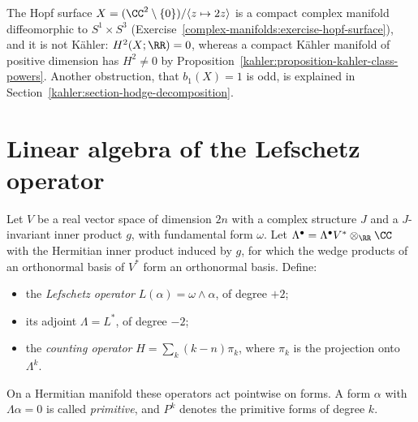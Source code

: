 \begin{counterexample}\label{kahler:counterexample-hopf}
The Hopf surface $X = (\CC^2 \setminus \{0\})/\langle z \mapsto 2z\rangle$ is a compact complex manifold diffeomorphic to $S^1 \times S^3$
(Exercise~\ref{complex-manifolds:exercise-hopf-surface}), and it is not K\"ahler: $H^2(X; \RR) = 0$, whereas a compact K\"ahler manifold of positive
dimension has $H^2 \neq 0$ by Proposition~\ref{kahler:proposition-kahler-class-powers}. Another obstruction, that $b_1(X) = 1$ is odd, is
explained in Section~\ref{kahler:section-hodge-decomposition}.
\end{counterexample}

\section{Linear algebra of the Lefschetz operator}\label{kahler:section-lefschetz-linear-algebra}

\begin{definition}\label{kahler:definition-lefschetz-operators}
Let $V$ be a real vector space of dimension $2n$ with a complex structure $J$ and a $J$-invariant inner product $g$, with fundamental form
$\omega$. Let $\Lambda^\bullet = \Lambda^\bullet V^* \otimes_\RR \CC$ with the Hermitian inner product induced by $g$, for which the wedge
products of an orthonormal basis of $V^*$ form an orthonormal basis. Define:
\begin{itemize}
\item the \emph{Lefschetz operator} $L(\alpha) = \omega \wedge \alpha$, of degree $+2$;
\item its adjoint $\Lambda = L^*$, of degree $-2$;
\item the \emph{counting operator} $H = \sum_k(k - n)\pi_k$, where $\pi_k$ is the projection onto $\Lambda^k$.
\end{itemize}
On a Hermitian manifold these operators act pointwise on forms. A form $\alpha$ with $\Lambda\alpha = 0$ is called \emph{primitive}, and
$P^k$ denotes the primitive forms of degree $k$.
\end{definition}

